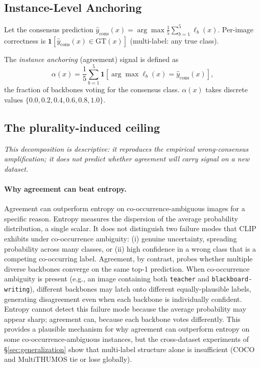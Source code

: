\documentclass[a4paper,fleqn]{cas-sc}
\begin{document}
\subsection{Instance-Level Anchoring}

Let the consensus prediction $\hat{y}_{\text{cons}}(x) = \arg\max \frac{1}{5}\sum_{b=1}^5 \ell_b(x)$.
Per-image correctness is $\mathbf{1}[\hat{y}_{\text{cons}}(x) \in \text{GT}(x)]$ (multi-label: any true class).

The \emph{instance anchoring} (agreement) signal is defined as
\begin{equation}
\alpha(x) = \frac{1}{5}\sum_{b=1}^5 \mathbf{1}[\arg\max \ell_b(x) = \hat{y}_{\text{cons}}(x)],
\label{eq:agreement}
\end{equation}
the fraction of backbones voting for the consensus class.
$\alpha(x)$ takes discrete values $\{0.0, 0.2, 0.4, 0.6, 0.8, 1.0\}$.

\subsection{The plurality-induced ceiling}
\label{sec:ceiling}

\emph{This decomposition is descriptive: it reproduces the empirical wrong-consensus amplification; it does not predict whether agreement will carry signal on a new dataset.}

\paragraph{Why agreement can beat entropy.}
Agreement can outperform entropy on co-occurrence-ambiguous images for a specific reason. Entropy measures the dispersion of the average probability distribution, a single scalar. It does not distinguish two failure modes that CLIP exhibits under co-occurrence ambiguity: (i) genuine uncertainty, spreading probability across many classes, or (ii) high confidence in a wrong class that is a competing co-occurring label.
Agreement, by contrast, probes whether multiple diverse backbones converge on the same top-1 prediction.
When co-occurrence ambiguity is present (e.g., an image containing both \texttt{teacher} and \texttt{blackboard-writing}), different backbones may latch onto different equally-plausible labels, generating disagreement even when each backbone is individually confident.
Entropy cannot detect this failure mode because the average probability may appear sharp; agreement can, because each backbone votes differently.
This provides a plausible mechanism for why agreement can outperform entropy on some co-occurrence-ambiguous instances, but the cross-dataset experiments of \S\ref{sec:generalization} show that multi-label structure alone is insufficient (COCO and MultiTHUMOS tie or lose globally).
\end{document}
